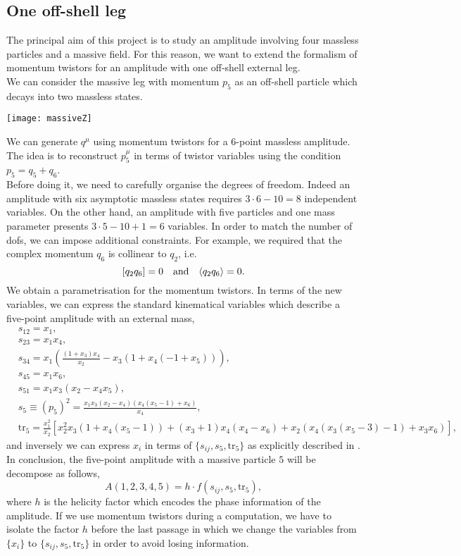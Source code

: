 \subsection{One off-shell leg}
The principal aim of this project is to study an amplitude involving four massless particles and a massive field. For this reason, we want to extend the formalism of momentum twistors for an amplitude with one off-shell external leg.\\
We can consider the massive leg with momentum $p_5$ as an off-shell particle which decays into two massless states.
\begin{center}
\texttt{[image: massiveZ]}
\end{center}
We can generate $q^\mu$ using momentum twistors for a $6$-point massless amplitude. The idea is to reconstruct $p_5^\mu$ in terms of twistor variables using the condition $p_5=q_5+q_6$.\\
Before doing it,  we need to carefully organise the degrees of freedom. Indeed an amplitude with six asymptotic massless states requires $3\cdot 6-10=8$ independent variables. On the other hand, an amplitude with five particles and one mass parameter presents $3\cdot5-10+1=6$ variables. In order to match the number of dofs, we can impose additional constraints. For example, we required that the complex momentum $q_6$ is collinear to $q_2$, i.e.
$$
	[q_2q_6]=0\hspace{0.35cm}\text{and}\hspace{0.35cm}\langle q_2q_6\rangle=0.
$$
We obtain a parametrisation for the momentum twistors. In terms of the new variables, we can express the standard kinematical variables which describe a five-point amplitude with an external mass,
\begin{align*}
	&s_{12}=x_1,\\
	&s_{23}=x_{1}x_4,\\
	&s_{34}=x_1\left(\frac{(1+x_3)x_4}{x_2}-x_3(1+x_4(-1+x_5))\right),\\
	&s_{45}=x_1x_6,\\
	&s_{51}=x_1x_3(x_2-x_4x_5),\\
	&s_{5}\equiv(p_5)^2=\frac{x_1x_3(x_2-x_4)\left(x_4(x_5-1)+x_6\right)}{x_4},\\
	&\text{tr}_5=\frac{x_1^2}{x_2}\left[x_2^2x_3(1+x_4(x_5-1))+(x_3+1)x_4(x_4-x_6)+x_2(x_4(x_3(x_5-3)-1)+x_3x_6)\right],
\end{align*}
and inversely we can express $x_i$ in terms of $\{s_{ij},s_{5},\text{tr}_5\}$ as explicitly described in \cite{Badger:2021ega}.\\
In conclusion, the five-point amplitude with a massive particle $5$ will be decompose as follows,
$$
	A(1,2,3,4,5)=h \cdot f(s_{ij},s_{5},\text{tr}_5),
$$
where $h$ is the helicity factor which encodes the phase information of the amplitude. If we use momentum twistors during a computation, we have to isolate the factor $h$ before the last passage in which we change the variables from $\{x_i\}$ to $\{s_{ij},s_{5},\text{tr}_5\}$ in order to avoid losing information.
